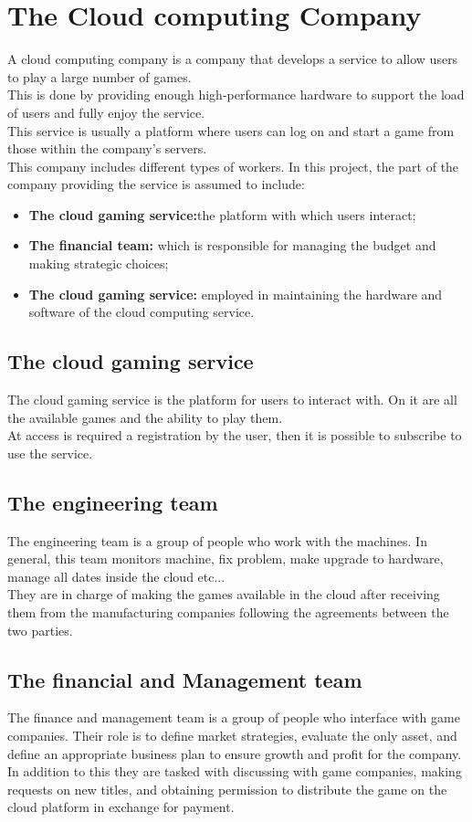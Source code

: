 \documentclass[a4paper,12pt]{report}
\begin{document}
\newpage
%
\section{The Cloud computing Company }
A cloud computing company is a company that develops a service to allow users to play a large number of games.\\
This is done by providing enough high-performance hardware to support the load of users and fully enjoy the service.\\
This service is usually a platform where users can log on and start a game from those within the company's servers.\\
This company includes different types of workers. In this project, the part of the company providing the service is assumed to include:
\begin{itemize}
\item{\textbf{The cloud gaming service:}the platform with which users interact;}
\item{\textbf{The financial team:} which is responsible for managing the budget and making strategic choices;}
\item{\textbf{The cloud gaming service:} employed in maintaining the hardware and software of the cloud computing service.}
\end{itemize}
%
\subsection{The cloud gaming service }
The cloud gaming service is the platform for users to interact with. On it are all the available games and the ability to play them. \\
At access is required a registration by the user, then it is possible to subscribe to use the service. 
%  
\subsection{The engineering team }
The engineering team is a group of people who work with the machines. In general, this team monitors machine, fix problem, make upgrade to hardware, manage all dates inside the cloud etc... \\
They are in charge of making the games available in the cloud after receiving them from the manufacturing companies following the agreements between the two parties.
%
\subsection{The financial and Management team }
The finance and management team is a group of people who interface with game companies. Their role is to define market strategies, evaluate the only asset, and define an appropriate business plan to ensure growth and profit for the company. In addition to this they are tasked with discussing with game companies, making requests on new titles, and obtaining permission to distribute the game on the cloud platform in exchange for payment. 
%
\end{document}
